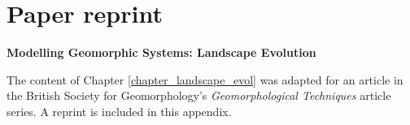 %
%
%
%
\chapter{Paper reprint}

\textbf{Modelling Geomorphic Systems: Landscape Evolution}

\noindent
The content of Chapter \ref{chapter_landscape_evol} was adapted for an article in the British Society for Geomorphology's \textit{Geomorphological Techniques} article series. A reprint is included in this appendix.



